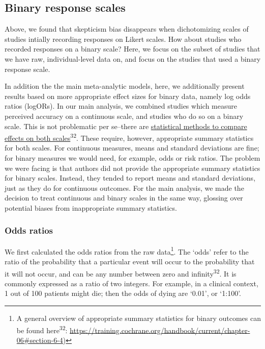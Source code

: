 \documentclass[
  man]{apa6}
\begin{document}
\subsection{Binary response scales}\label{binary-response-scales}

Above, we found that skepticism bias disappears when dichotomizing scales of studies intially recording responses on Likert scales. How about studies who recorded responses on a binary scale? Here, we focus on the subset of studies that we have raw, individual-level data on, and focus on the studies that used a binary response scale.

In addition the the main meta-analytic models, here, we additionally present results based on more appropriate effect sizes for binary data, namely log odds ratios (logORs). In our main analysis, we combined studies which measure perceived accuracy on a continuous scale, and studies who do so on a binary scale. This is not problematic per se--there are \href{https://training.cochrane.org/handbook/current/chapter-10\#section-10-6}{statistical methods to compare effects on both scales}\textsuperscript{32}. These require, however, appropriate summary statistics for both scales. For continuous measures, means and standard deviations are fine; for binary measures we would need, for example, odds or risk ratios. The problem we were facing is that authors did not provide the appropriate summary statistics for binary scales. Instead, they tended to report means and standard deviations, just as they do for continuous outcomes. For the main analysis, we made the decision to treat continuous and binary scales in the same way, glossing over potential biases from inappropriate summary statistics.

\subsubsection{Odds ratios}\label{odds-ratios}

We first calculated the odds ratios from the raw data\footnote{A general overview of appropriate summary statistics for binary outcomes can be found here\textsuperscript{32}: \url{https://training.cochrane.org/handbook/current/chapter-06\#section-6-4})}. The `odds' refer to the ratio of the probability that a particular event will occur to the probability that it will not occur, and can be any number between zero and infinity\textsuperscript{32}. It is commonly expressed as a ratio of two integers. For example, in a clinical context, 1 out of 100 patients might die; then the odds of dying are `0.01', or `1:100'.
\end{document}
